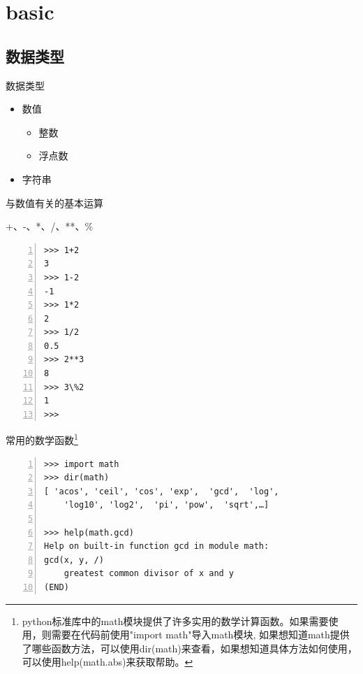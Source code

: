 \documentclass{beamer}
\begin{document}
\section{basic}
\begin{frame}
\end{frame}
\subsection{数据类型}
\begin{frame}{数据类型}
\begin{itemize}
\item
数值
\begin{itemize}
\item
整数
\item
浮点数
\end{itemize}
\item
字符串
\end{itemize}
\end{frame}
\begin{frame}[fragile]{与数值有关的基本运算}
\begin{block}{+、-、*、/、**、\%}
\begin{Verbatim}[numbers=left,frame=single,rulecolor=\color{red}]
>>> 1+2
3
>>> 1-2
-1
>>> 1*2
2
>>> 1/2
0.5
>>> 2**3
8
>>> 3\%2
1
>>> 
\end{Verbatim}
\end{block}

\end{frame}
\begin{frame}[fragile]{常用的数学函数\footnote{python标准库中的math模块提供了许多实用的数学计算函数。如果需要使用，则需要在代码前使用"import math"导入math模块, 如果想知道math提供了哪些函数方法，可以使用dir(math)来查看，如果想知道具体方法如何使用，可以使用help(math.abs)来获取帮助。}}

\begin{block}{}
\begin{Verbatim}[numbers=left,frame=single,rulecolor=\color{red}]
>>> import math
>>> dir(math)
[ 'acos', 'ceil', 'cos', 'exp',  'gcd',  'log', 
    'log10', 'log2',  'pi', 'pow',  'sqrt',…]

>>> help(math.gcd)
Help on built-in function gcd in module math:
gcd(x, y, /)
    greatest common divisor of x and y
(END)
\end{Verbatim}
\end{block}
\end{frame}
\end{document}
